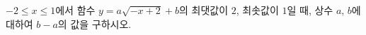 \hspace*{2mm}\begin{minipage}[t]{\dimexpr\linewidth-2mm\relax}\vspace{0pt}
$-2\le x\le 1$에서 함수 $y=a\sqrt{-x+2}+b$의 최댓값이 $2$, 최솟값이 $1$일 때, 상수 $a$, $b$에 대하여 $b-a$의 값을 구하시오. \end{minipage}
